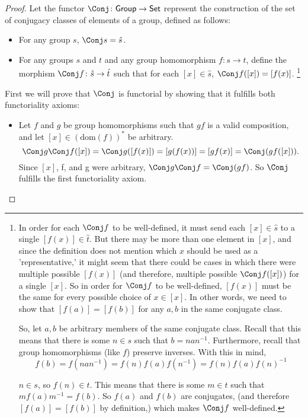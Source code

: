\documentclass[../../main]{subfiles}
\begin{document}
\begin{proof}
	Let the functor \(\Conj\colon\mathsf{Group\to Set}\) represent the construction of
	the set of conjugacy classes of elements of a group, defined as follows:
	\begin{itemize}
		\item For any group \(s\), \(\Conj s = \hat{s}\).

		\item For any groups \(s\) and \(t\) and any group homomorphism
			\(f\colon s\to t\), define the morphism \(\Conj f\colon \hat{s}\to \hat{t}\)
			such that for each \([x]\in \hat{s}\), \(\Conj f([x]) = [f(x)]\).%
			\footnote{
				In order for each \(\Conj f\) to be well-defined,
				it must send each \([x]\in \hat{s}\) to a single \([f(x)]\in \hat{t}\). But there
				may be more than one element in \([x]\), and since the definition does not
				mention which \(x\) should be used as a 'representative,' it might seem that
				there could be cases in which there were multiple possible \([f(x)]\) (and
				therefore, multiple possible \(\Conj f([x])\)) for a single \([x]\). So in order
				for \(\Conj f\) to be well-defined, \([f(x)]\) must be the same for every
				possible choice of \(x\in [x]\). In other words, we need to show that
				\([f(a)] = [f(b)]\) for any \(a, b\) in the same conjugate class.

				So, let \(a, b\) be arbitrary members of the same conjugate class. Recall
				that this means that there is some \(n\in s\) such that \(b = nan^{-1}\).
				Furthermore, recall that group homomorphisms (like \(f\)) preserve inverses.
				With this in mind, \[f(b) = f(nan^{-1}) = f(n)f(a)f(n^{-1}) =
				f(n)f(a)f(n)^{-1}\]

				\(n\in s\), so \(f(n)\in t\). This means that there is some \(m\in t\) such
				that \(mf(a)m^{-1} = f(b)\). So \(f(a)\) and \(f(b)\) are conjugates, (and
				therefore \([f(a)] = [f(b)]\) by definition,) which makes
				\(\Conj f\)
			well-defined.}
		\end{itemize}

		First we will prove that \(\Conj \) is functorial by showing that it fulfills
		both functoriality axioms:
		\begin{itemize}
			\item Let \(f\) and \(g\) be group homomorphisms such that \(gf\) is a
				valid composition, and let \([x]\in(\textrm{dom}(f))^*\) be
				arbitrary. \[\Conj g\Conj f([x])=\Conj
				g([f(x)])=[g(f(x))]=[gf(x)]=\Conj (gf([x])).\]
				Since \([x]\), f, and g were arbitrary, \(\Conj g\Conj f = \Conj
				(gf)\). So \(\Conj \)
				fulfills the first functoriality axiom.


\end{itemize}
\end{proof}
\end{document}
